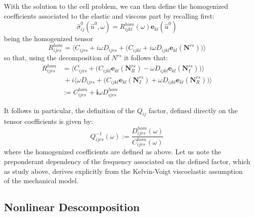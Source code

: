 With the solution to the cell problem, we can then define the homogenized coefficients associated to the elastic and viscous part by recalling first:
\begin{equation*}
    \hat{\sigma}_{ij}^0 (\hat{u}^0,\omega) = R_{ijkl}^{hom} (\omega) \mathbf{e}_{kl}(\hat{u}^0)
\end{equation*}
being the homogenized tensor
\begin{equation*}
    R^{hom}_{ijrs}= \big \langle  C_{ijrs} + i\omega D_{ijrs} + \big( C_{ijkl} + i \omega D_{ijkl} \mathbf{e}_{kl}(\mathbf{N}^{rs}) \big) \big \rangle  
\end{equation*}
so that, using the decomposition of $N^{rs}$ it follows that:
\begin{align*}
    R^{hom}_{ijrs} &= \big \langle C_{ijrs} + \big( C_{ijkl}\mathbf{e}_{kl}( \mathbf{N}^{rs}_R) -\omega D_{ijkl}\mathbf{e}_{kl}(\mathbf{N}^{rs}_I) \big) \big \rangle \\
    & \, + i \big \langle \omega D_{ijrs} + \big( C_{ijkl} \mathbf{e}_{kl}(\mathbf{N}^{rs}_I) + \omega D_{ijkl}\mathbf{e}_{kl}(\mathbf{N}^{rs}_R) \big) \big \rangle \\
    & := C^{hom}_{ijrs} + \mathbf{i} \omega D^{hom}_{ijrs}
\end{align*}

It follows in particular, the definition of the $Q_{ij}$ factor, defined directly on the tensor coefficients is given by:
\begin{equation}
    \label{Qfactor-Def}
    Q_{ijrs}^{-1}(\omega) := \frac{D^{hom}_{ijrs}(\omega)}{ C^{hom}_{ijrs}(\omega)}
\end{equation}
where the homogenized coefficients are defined as above.
Let us note the preponderant dependency of the frequency associated on the defined factor, which as study above, derives explicitly from the Kelvin-Voigt viscoelastic assumption of the mechanical model. 

\subsection{Nonlinear Descomposition}

